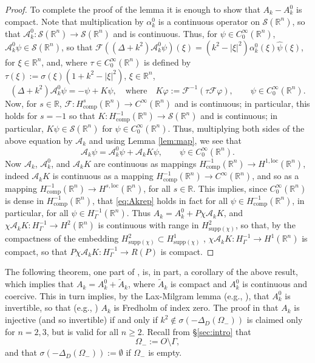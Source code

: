 \documentclass{birkjour}
\theoremstyle{definition}
\theoremstyle{remark}
\numberwithin{equation}{section}
\newcommand{\R}{\mathbb{R}}
\newcommand{\Hol}{H^{1,\mathrm{loc}}}
\newcommand{\cS}{\mathcal{S}}
\newcommand{\cA}{\mathcal{A}}
\newcommand{\cF}{\mathcal{F}}
\newcommand{\supp}{\mathrm{supp}}
\begin{document}
\begin{proof}
To complete the proof of the lemma it is enough to show that $A_k-A_k^0$ is compact. Note that multiplication by $\alpha_k^0$ is a continuous operator on $\cS(\R^n)$, so that $\cA_k^0:\cS(\R^n)\to \cS(\R^n)$ and is continuous. Thus, for $\psi\in C_0^\infty(\R^n)$, $\cA_k^0\psi\in \cS(\R^n)$, so that $\cF((\Delta + k^2)\cA^0_k\psi)(\xi) = (k^2-|\xi|^2)\alpha_k^0(\xi)\hat\psi(\xi)$, for $\xi\in \R^n$, 
and, where $\tau\in C_0^\infty(\R^n)$ is defined by $\tau(\xi) := \sigma(\xi)(1+k^2-|\xi|^2)$, $\xi\in \R^n$,
$$
(\Delta+k^2)\cA_k^0\psi = -\psi +K\psi, \quad \mbox{where} \quad   K\varphi:=  \cF^{-1}(\tau\cF\varphi), \qquad \psi \in C_0^\infty(\R^n).
$$
Now, for $s\in \R$,  $\cF:H^s_{\mathrm{comp}}(\R^n)\to C^\infty(\R^n)$ and is continuous; in particular, this holds for $s=-1$ so that $K:H^{-1}_{\mathrm{comp}}(\R^n)\to \cS(\R^n)$ and is continuous; in particular, $K\psi\in \cS(\R^n)$ for $\psi\in C_0^\infty(\R^n)$. Thus, 
multiplying both sides of the above equation by $\cA_k$ and using Lemma \ref{lem:map}, we see that
\begin{equation} \label{eq:Akrep}
\cA_k\psi = \cA_k^0 \psi + \cA_k K\psi, \qquad \psi \in C_0^\infty(\R^n).
\end{equation}
Now $\cA_k$, $\cA_k^0$, and $\cA_k K$ are continuous as mappings $H^{-1}_{\mathrm{comp}}(\R^n)\to \Hol(\R^n)$, indeed $\cA_k K$ is continuous as a mapping $H^{-1}_{\mathrm{comp}}(\R^n)\to C^\infty(\R^n)$, and so as a mapping $H^{-1}_{\mathrm{comp}}(\R^n)\to H^{s,\mathrm{loc}}(\R^n)$, for all $s\in \R$. This implies, since $C_0^\infty(\R^n)$ is dense in $H^{-1}_{\mathrm{comp}}(\R^n)$, that \eqref{eq:Akrep} holds in fact for all $\psi \in H^{-1}_{\mathrm{comp}}(\R^n)$, in particular, for all $\psi \in H^{-1}_{\Gamma}(\R^n)$. Thus $A_k = A_k^0+P\chi \cA_k K$, and  $\chi\cA_k K:H^{-1}_\Gamma\to H^2(\R^n)$ is continuous with range in $H^2_{\supp(\chi)}$, so that, by the compactness of the embedding $H^2_{\supp(\chi)}\subset H^1_{\supp(\chi)}$ \cite[Thm.~3.27(i)]{mclean2000strongly}, $\chi\cA_k K:H^{-1}_\Gamma\to H^1(\R^n)$ is compact, so that $P\chi \cA_k K:H^{-1}_\Gamma\to R(P)$ is compact.
\end{proof}

The following theorem, one part of \cite[Thm.~3.4]{caetano2025integral}, is, in part, a corollary of the above result, which implies that $A_k=A_k^0+\widetilde A_k$, where $\widetilde A_k$ is compact and $A_k^0$ is continuous and coercive. This in turn implies, by the Lax-Milgram lemma  (e.g., \cite[Lem.~2.32]{mclean2000strongly}), that $A_k^0$ is invertible, so that  (e.g., \cite[Thm.~2.33]{mclean2000strongly}) $A_k$ is Fredholm of index zero. The proof in \cite[Thm.~3.4]{caetano2025integral} that $A_k$ is injective (and so invertible) if and only if  $k^2\not\in \sigma(-\Delta_D(\Omega_-))$ is claimed only for $n=2,3$, but is valid for all $n\geq 2$. Recall from \S\ref{sec:intro} that 
\begin{equation} \label{eq:Omegam}
\Omega_-:= O\setminus \Gamma,
\end{equation} 
and that $\sigma(-\Delta_D(\Omega_-)):= \emptyset$ if $\Omega_-$ is empty.
\end{document}
